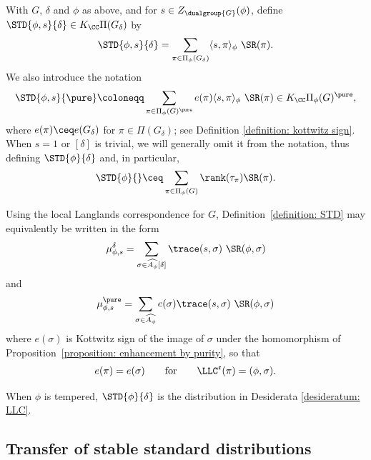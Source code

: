 \documentclass[11pt,letterpaper]{amsart}
\numberwithin{equation}{section}
\begin{document}
\begin{definition}
\label{definition: STD}
With $G$, $\delta$ and $\phi$ as above, and for $s\in Z_{\dualgroup{G}}(\phi)$, define $\STD{\phi,s}{\delta} \in K_\CC \Pi(G_{\delta})$ by
\begin{equation*}
\STD{\phi,s}{\delta}
= 
\sum_{\pi\in \Pi_\phi(G_\delta)}
 \langle s,\pi \rangle_\phi\ \SR(\pi).
\end{equation*}
We also introduce the notation
\begin{equation*}
     \STD{\phi,s}{\pure} 
     \coloneqq
     \mathop{\sum}\limits_{\pi\in \Pi_\phi(G)^\pure} e(\pi) \langle s,\pi \rangle_\phi\ \SR(\pi) \in K_\CC \Pi_\phi(G)^\pure, 
\end{equation*}
where  $e(\pi)\ceq e(G_\delta)$ for $\pi \in \Pi(G_\delta)$; see Definition \ref{definition: kottwitz sign}. 
When $s=1$ or $[\delta]$ is trivial, we will generally omit it from the notation, thus defining $\STD{\phi}{\delta}$ and, in particular, 
\[
\STD{\phi}{}
\ceq
\sum_{\pi\in \Pi_\phi(G)} \rank(\tau_\pi) \SR(\pi).
\]
\end{definition}

Using the local Langlands correspondence for $G$, Definition~\ref{definition: STD} may equivalently be written in the form
\[
\mu_{\phi,s}^{\delta}
= 
\sum_{\sigma \in \widehat{A_\phi}[\delta]} \trace(s,\sigma)\ \SR(\phi, \sigma)
\]
and
\[
\mu_{\phi,s}^{\pure}
= 
\sum_{\sigma \in \widehat{A_\phi}} 
e(\sigma) \trace(s,\sigma)\ 
\SR(\phi, \sigma)
\]
where $e(\sigma)$ 
is Kottwitz sign of the image of $\sigma$ under the homomorphism of Proposition~\ref{proposition: enhancement by purity}, so that 
\[
e(\pi) = e(\sigma)
\qquad \text{for} \qquad \LLC^\mathfrak{e}(\pi) = (\phi,\sigma).
\]

\begin{remark}
When $\phi$ is tempered, $\STD{\phi}{\delta}$ is the distribution in Desiderata \ref{desideratum: LLC}\Sta. 
\end{remark}






\subsection{Transfer of stable standard distributions}\label{subsection: transfer of STD}
\end{document}
